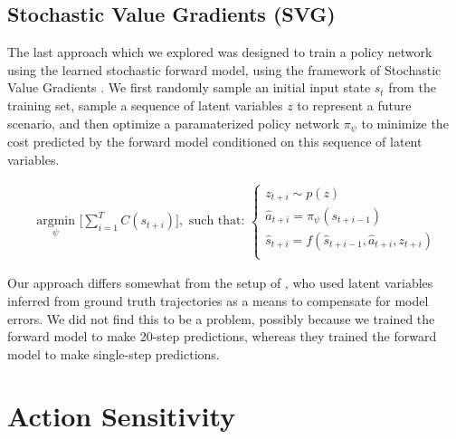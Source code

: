 \documentclass{article} %
\begin{document}



  \subsection{Stochastic Value Gradients (SVG)}

  The last approach which we explored was designed to train a policy network using the learned stochastic forward model, using the framework of Stochastic Value Gradients \citep{SVG}.
  We first randomly sample an initial input state $s_t$ from the training set, sample a sequence of latent variables $z$ to represent a future scenario, and then optimize a paramaterized policy network $\pi_\psi$ to minimize the cost predicted by the forward model conditioned on this sequence of latent variables.

    \begin{align*}
    \underset{\psi}{\mbox{ argmin }} \Big[ \sum_{i=1}^{T} C(s_{t+i}) \Big],  \mbox{ such that: }
    \begin{cases}
      z_{t+i} \sim p(z) \\
      \hat{a}_{t+i} = \pi_\psi(s_{t+i-1}) \\
      \hat{s}_{t+i} = f(\hat{s}_{t+i-1}, \hat{a}_{t+i}, z_{t+i}) \\
      \end{cases}
    \end{align*}

    Our approach differs somewhat from the setup of \citep{SVG}, who used latent variables inferred from ground truth trajectories as a means to compensate for model errors. We did not find this to be a problem, possibly because we trained the forward model to make 20-step predictions, whereas they trained the forward model to make single-step predictions.


    \section{Action Sensitivity}
    \label{action-sensitivity-appendix}


\begin{figure}[h]
    \centering
    \caption{}
    \label{action-sens}
\end{figure}
\end{document}
